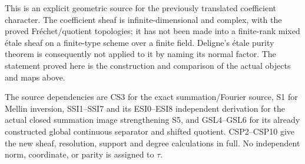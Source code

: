 This is an explicit geometric source for the previously translated
coefficient character. The coefficient sheaf is infinite-dimensional and
complex, with the proved Fréchet/quotient topologies; it has not been
made into a finite-rank mixed étale sheaf on a finite-type scheme over a
finite field. Deligne's étale purity theorem is consequently not applied
to it by naming its normal factor. The statement proved here is the
construction and comparison of the actual objects and maps above.

The source dependencies are CS3 for the exact summation/Fourier source,
S1 for Mellin inversion, SSI1--SSI7 and its ESI0--ESI8 independent
derivation for the actual closed summation image strengthening S5, and
GSL4--GSL6 for its already constructed global continuous separator and
shifted quotient. CSP2--CSP10 give the new sheaf, resolution, support
and degree calculations in full. No independent norm, coordinate, or
parity is assigned to \(\tau\).

